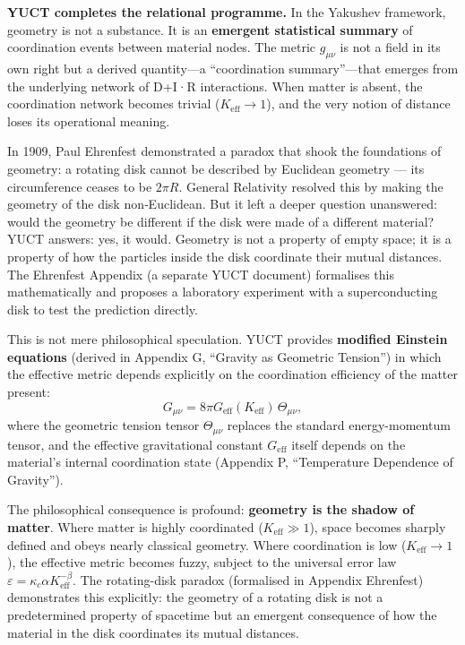 \documentclass[12pt,a4paper]{article}
\begin{document}
	\textbf{YUCT completes the relational programme.} In the Yakushev framework, geometry is not a substance. It is an \textbf{emergent statistical summary} of coordination events between material nodes. The metric \(g_{\mu\nu}\) is not a field in its own right but a derived quantity—a ``coordination summary''—that emerges from the underlying network of D+I·R interactions. When matter is absent, the coordination network becomes trivial (\(K_{\mathrm{eff}} \to 1\)), and the very notion of distance loses its operational meaning.
	
	In 1909, Paul Ehrenfest demonstrated a paradox that shook the foundations of geometry: a rotating disk cannot be described by Euclidean geometry — its circumference ceases to be \(2\pi R\). General Relativity resolved this by making the geometry of the disk non‑Euclidean. But it left a deeper question unanswered: would the geometry be different if the disk were made of a different material? YUCT answers: yes, it would. Geometry is not a property of empty space; it is a property of how the particles inside the disk coordinate their mutual distances. The Ehrenfest Appendix (a separate YUCT document) formalises this mathematically and proposes a laboratory experiment with a superconducting disk to test the prediction directly.
	
	This is not mere philosophical speculation. YUCT provides \textbf{modified Einstein equations} (derived in Appendix G, ``Gravity as Geometric Tension'') in which the effective metric depends explicitly on the coordination efficiency of the matter present:
	\[
	G_{\mu\nu} = 8\pi G_{\mathrm{eff}}(K_{\mathrm{eff}}) \, \Theta_{\mu\nu},
	\]
	where the geometric tension tensor \(\Theta_{\mu\nu}\) replaces the standard energy-momentum tensor, and the effective gravitational constant \(G_{\mathrm{eff}}\) itself depends on the material's internal coordination state (Appendix P, ``Temperature Dependence of Gravity'').
	
	The philosophical consequence is profound: \textbf{geometry is the shadow of matter}. Where matter is highly coordinated (\(K_{\mathrm{eff}} \gg 1\)), space becomes sharply defined and obeys nearly classical geometry. Where coordination is low (\(K_{\mathrm{eff}} \to 1\)), the effective metric becomes fuzzy, subject to the universal error law \(\varepsilon = \kappa_c \alpha K_{\mathrm{eff}}^{-\beta}\). The rotating-disk paradox (formalised in Appendix Ehrenfest) demonstrates this explicitly: the geometry of a rotating disk is not a predetermined property of spacetime but an emergent consequence of how the material in the disk coordinates its mutual distances.
	
\end{document}

